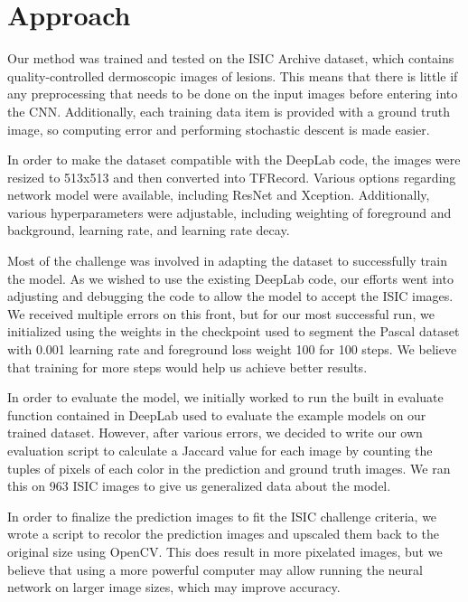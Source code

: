 \documentclass[11pt, letterpaper]{article}
\begin{document}
\section{Approach}
	Our method was trained and tested on the ISIC Archive dataset, which contains quality-controlled dermoscopic images of lesions. This means that there is little if any preprocessing that needs to be done on the input images before entering into the CNN. Additionally, each training data item is provided with a ground truth image, so computing error and performing stochastic descent is made easier.
	
	In order to make the dataset compatible with the DeepLab code, the images were resized to 513x513 and then converted into TFRecord. Various options regarding network model were available, including ResNet and Xception. Additionally, various hyperparameters were adjustable, including weighting of foreground and background, learning rate, and learning rate decay. 
	
	Most of the challenge was involved in adapting the dataset to successfully train the model. As we wished to use the existing DeepLab code, our efforts went into adjusting and debugging the code to allow the model to accept the ISIC images. We received multiple errors on this front, but for our most successful run, we initialized using the weights in the checkpoint used to segment the Pascal dataset with 0.001 learning rate and foreground loss weight 100 for 100 steps. We believe that training for more steps would help us achieve better results.
	
In order to evaluate the model, we initially worked to run the built in evaluate function contained in DeepLab used to evaluate the example models on our trained dataset. However, after various errors, we decided to write our own evaluation script to calculate a Jaccard value for each image by counting the tuples of pixels of each color in the prediction and ground truth images. We ran this on 963 ISIC images to give us generalized data about the model.

	In order to finalize the prediction images to fit the ISIC challenge criteria, we wrote a script to recolor the prediction images and upscaled them back to the original size using OpenCV. This does result in more pixelated images, but we believe that using a more powerful computer may allow running the neural network on larger image sizes, which may improve accuracy.
	
\end{document}
